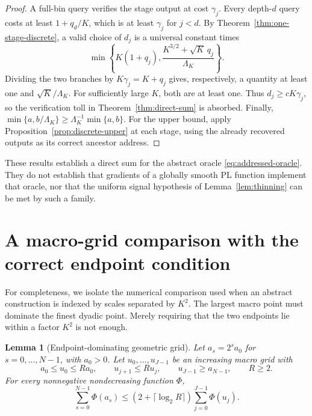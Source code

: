 \documentclass[11pt,a4paper]{article}
\newtheorem{lemma}[theorem]{Lemma}
\theoremstyle{definition}
\theoremstyle{remark}
\begin{document}
\begin{proof}
A full-bin query verifies the stage output at cost $\gamma_j$.
Every depth-$d$ query costs at least $1+q_d/K$, which is at least
$\gamma_j$ for $j<d$.  By Theorem~\ref{thm:one-stage-discrete}, a valid
choice of $d_j$ is a universal constant times
\[
 \min\left\{K(1+q_j),
       \frac{K^{3/2}+\sqrt K\,q_j}{\Lambda_K}\right\}.
\]
Dividing the two branches by $K\gamma_j=K+q_j$ gives, respectively, a
quantity at least one and $\sqrt K/\Lambda_K$.  For sufficiently large
$K$, both are at least one.  Thus $d_j\ge cK\gamma_j$, so the verification
toll in Theorem~\ref{thm:direct-sum} is absorbed.  Finally,
$\min\{a,b/\Lambda_K\}\ge\Lambda_K^{-1}\min\{a,b\}$.
For the upper bound, apply Proposition~\ref{prop:discrete-upper} at each
stage, using the already recovered outputs as its correct ancestor address.
\end{proof}

These results establish a direct sum for the abstract oracle
\eqref{eq:addressed-oracle}.  They do not establish that gradients of a
globally smooth PL function implement that oracle, nor that the uniform
signal hypothesis of Lemma~\ref{lem:thinning} can be met by such a family.


\section{A macro-grid comparison with the correct endpoint condition}
\label{app:grid}

For completeness, we isolate the numerical comparison used when
an abstract construction is indexed by scales separated by
$K^2$.  The largest macro point must dominate the finest
dyadic point.  Merely requiring that the two endpoints lie
within a factor $K^2$ is not enough.

\begin{lemma}[Endpoint-dominating geometric grid]
\label{lem:grid-comparison}
Let $a_s=2^s a_0$ for $s=0,\ldots,N-1$, with $a_0>0$.
Let $u_0,\ldots,u_{J-1}$ be an increasing macro grid with
\begin{equation}
 a_0\le u_0\le R a_0,\qquad
 u_{j+1}\le R u_j,\qquad
 u_{J-1}\ge a_{N-1},
 \qquad R\ge2.
 \label{eq:macro-grid-conditions}
\end{equation}
For every nonnegative nondecreasing function $\Phi$,
\begin{equation}
 \sum_{s=0}^{N-1}\Phi(a_s)
 \le(2+\lceil\log_2R\rceil)
       \sum_{j=0}^{J-1}\Phi(u_j).
 \label{eq:macro-grid-comparison}
\end{equation}
\end{lemma}
\end{document}

